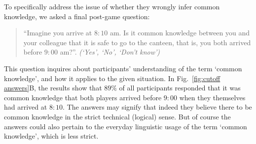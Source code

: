To specifically address the issue of whether they wrongly infer common knowledge, we asked a final post-game question:

\begin{quote}
\indent
``Imagine you arrive at $8{:}10$ am. Is it common knowledge between you and your colleague that it is safe to go to the canteen, that is, you both arrived before $9{:}00$ am?''. \textit{(`Yes', `No', `Don't know')}
\end{quote}

\noindent
This question inquires about participants' understanding of the term `common knowledge', and how it applies to the given situation. In Fig.~\ref{fig:cutoff answers}B, the results show that $89\%$ of all participants responded that it was common knowledge that both players arrived before $9{:}00$ when they themselves had arrived at $8{:}10$. The answers may signify that indeed they believe there to be common knowledge in the strict technical (logical) sense. But of course the answers could also pertain to the everyday linguistic usage of the term `common knowledge', which is less strict.







